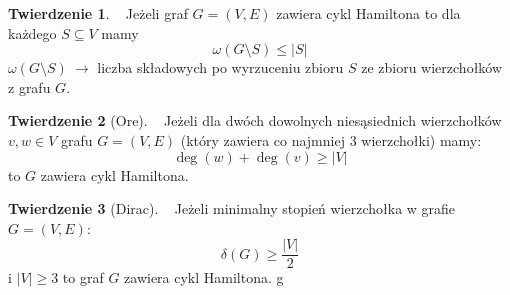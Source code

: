 \documentclass[a4paper,12pt]{article}
\theoremstyle{definition}%
\newtheorem{theorem}{Twierdzenie}%
\theoremstyle{definition}
\theoremstyle{problem}
\begin{document}
\begin{theorem}~ %
Jeżeli graf $G=(V,E)$ zawiera cykl Hamiltona to dla każdego $S\subseteq V$ mamy
$$\omega (G\setminus S)\leq |S|$$
$\omega (G\setminus S)\ \rightarrow$ liczba składowych po wyrzuceniu zbioru $S$ ze zbioru wierzchołków z grafu $G$.
\end{theorem}
\begin{theorem}[Ore]\label{the:Ore}~ %
Jeżeli dla dwóch dowolnych niesąsiednich wierzchołków $v,w\in V$ grafu $G=(V,E)$ (który zawiera co najmniej $3$ wierzchołki) mamy: 
$$\deg (w) + \deg (v) \geq |V|$$
to $G$ zawiera cykl Hamiltona.
\end{theorem}
\begin{theorem}[Dirac]\label{the:Dirac}~ %
Jeżeli minimalny stopień wierzchołka w grafie $G=(V,E)$: $$\delta (G) \geq \frac{|V|}{2}$$ i $|V|\geq 3$ to graf $G$ zawiera cykl Hamiltona. 
g\end{theorem}
\end{document}

